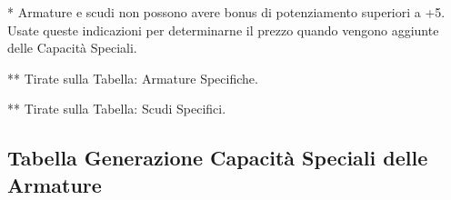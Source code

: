 \documentclass[a4paper,11pt,twoside,openany]{book}
\begin{document}
{*} Armature e scudi non possono avere bonus di potenziamento superiori a +5. Usate queste indicazioni per determinarne il prezzo quando vengono aggiunte delle Capacità Speciali.

	{*}{*} Tirate sulla Tabella: Armature Specifiche.

	{*}{*} Tirate sulla Tabella: Scudi Specifici.



\subsection{Tabella Generazione Capacità Speciali delle Armature}

\label{tabella-generazione-capacita-speciali-delle-armature}

\begin{tabularx}{0.95\textwidth}{lllXX}


\end{tabularx}
\end{document}

